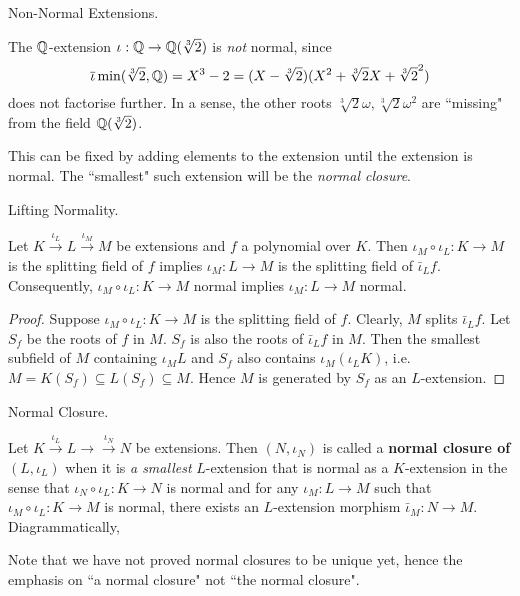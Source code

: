 \documentclass[../book.tex]{subfiles}
\begin{document}
\begin{eg} Non-Normal Extensions. 
    
    The $\mathbb{Q}$-extension $\iota : \mathbb{Q} \to \mathbb{Q}(\sqrt[3]{2})$ is \emph{not} normal, 
    since \[
        \overline{\iota}\min(\sqrt[3]{2},\mathbb{Q}) = X^3 - 2 
        = (X - \sqrt[3]{2})(X^2 + \sqrt[3]{2}X + \sqrt[3]{2}^2)
    \]
    does not factorise further. 
    In a sense, the other roots $\sqrt[3]{2}\omega, \sqrt[3]{2}\omega^2$ 
    are ``missing" from the field $\mathbb{Q}(\sqrt[3]{2})$. 
    
    This can be fixed by adding elements to the extension until 
    the extension is normal.
    The ``smallest" such extension will be the \emph{normal closure}.
\end{eg}
\begin{lem} Lifting Normality. 

    Let $K \overset{\iota_L}{\to} L \overset{\iota_M}{\to} M$ be extensions
    and $f$ a polynomial over $K$. 
    Then $\iota_M\circ\iota_L : K \to M$ is the splitting field of $f$
    implies $\iota_M : L \to M$ is the splitting field of $\bar\iota_L f$. 
    Consequently, $\iota_M\circ\iota_L : K \to M$ normal 
    implies $\iota_M : L \to M$ normal. 
    
\end{lem}
\begin{proof}
    Suppose $\iota_M\circ\iota_L : K \to M$ is the splitting field of $f$. 
    Clearly, $M$ splits $\bar\iota_L f$. 
    Let $S_f$ be the roots of $f$ in $M$. 
    $S_f$ is also the roots of $\bar\iota_L f$ in $M$. 
    Then the smallest subfield of $M$ containing $\iota_M L$ and $S_f$ 
    also contains $\iota_M(\iota_L K)$, 
    i.e. $M = K(S_f) \subseteq L(S_f) \subseteq M$.
    Hence $M$ is generated by $S_f$ as an $L$-extension. 
\end{proof}
\begin{dfn} Normal Closure. 
    
    Let $K \overset{\iota_L}{\to} L \to \overset{\iota_N}{\to} N$ be extensions. 
    Then $(N,\iota_N)$ is called 
    a \textbf{normal closure of $(L,\iota_L)$} when
    it is \emph{a smallest} $L$-extension that is normal as a $K$-extension
    in the sense that $\iota_N\circ\iota_L : K \to N$ is normal and 
    for any $\iota_M : L \to M$ such that $\iota_M\circ\iota_L : K \to M$ is normal,
    there exists an $L$-extension morphism $\bar\iota_M : N \to M$.
    Diagrammatically, 
    \begin{figure} [H]
        \centering
    \end{figure}
    
    Note that we have not proved normal closures to be unique yet,
    hence the emphasis on ``a normal closure" not ``the normal closure". 
\end{dfn}
\end{document}
